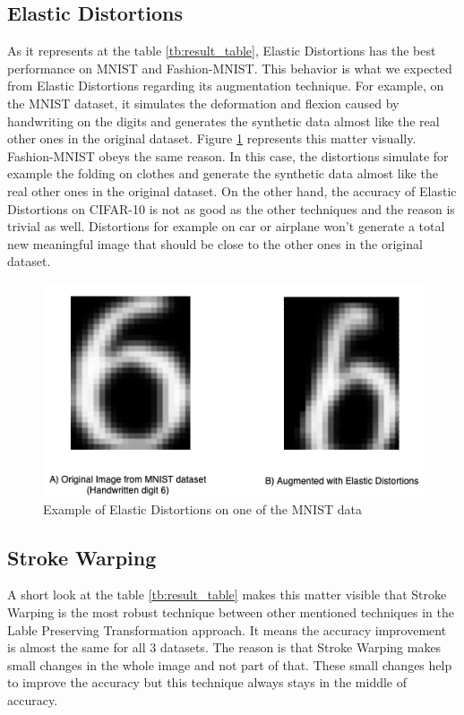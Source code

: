\subsection{Elastic Distortions}
As it represents at the table \ref{tb:result_table}, Elastic Distortions has the best performance on MNIST and Fashion-MNIST. This behavior is what we expected from Elastic Distortions regarding its augmentation technique. For example, on the MNIST dataset, it simulates the deformation and flexion caused by handwriting on the digits and generates the synthetic data almost like the real other ones in the original dataset. Figure \ref{fig:Elastic_Distortion_Example} represents this matter visually. Fashion-MNIST obeys the same reason. In this case, the distortions simulate for example the folding on clothes and generate the synthetic data almost like the real other ones in the original dataset. On the other hand, the accuracy of Elastic Distortions on CIFAR-10 is not as good as the other techniques and the reason is trivial as well. Distortions for example on car or airplane won't generate a total new meaningful image that should be close to the other ones in the original dataset.

\begin{figure}
  \centering
  \label{fig:Elastic_Distortion_Example}
  \includegraphics[width=1\textwidth]{fig/result/Elastic-Distortions-Example}
  \caption{Example of Elastic Distortions on one of the MNIST data}
\end{figure}

\subsection{Stroke Warping}
A short look at the table \ref{tb:result_table} makes this matter visible that Stroke Warping is the most robust technique between other mentioned techniques in the Lable Preserving Transformation approach. It means the accuracy improvement is almost the same for all $3$ datasets. The reason is that Stroke Warping makes small changes in the whole image and not part of that. These small changes help to improve the accuracy but this technique always stays in the middle of accuracy. 


